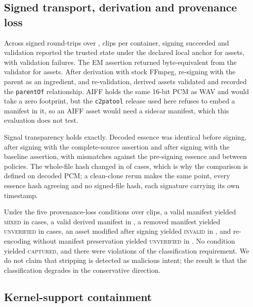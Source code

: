 \documentclass[preprint,3p,11pt,authoryear]{elsarticle}
\begin{document}
\subsection{Signed transport, derivation and provenance loss}
\label{sec:res-transport}

Across \Ftotal{} signed round-trips over \Fcontainerlist{}, \Fclips{} clips
per container, signing succeeded and validation reported the
trusted state under the declared local anchor for \Ftrusted{} assets, with
\Fvalfail{} validation failures. The EM assertion returned byte-equivalent from
the validator for \Fassertion{} assets. After derivation with stock FFmpeg,
re-signing with the parent as an ingredient, and re-validation, \Fderived{}
derived assets validated and \Fparent{} recorded the \texttt{parentOf}
relationship. AIFF holds the same 16-bit PCM as WAV and would take a zero
footprint, but the \texttt{c2patool} release used here refuses to embed a
manifest in it, so an AIFF asset would need a sidecar manifest, which this
evaluation does not test.

Signal transparency holds exactly. Decoded essence was identical before
signing, after signing with the complete-source assertion and after signing
with the baseline assertion, with \Fmismatch{} mismatches against the
pre-signing essence and \FmismatchPolicy{} between policies. The whole-file hash changed in \Ffilechanged{} of \Ftotal{} cases, which is
why the comparison is defined on decoded PCM; a clean-clone rerun makes the
same point, every essence hash agreeing and no signed-file hash, each
signature carrying its own timestamp.

Under the five provenance-loss conditions over \Eclips{} clips, a valid
manifest yielded \textsc{mixed} in \Evalid{} cases, a valid derived manifest
in \EvalidDerived{}, a removed manifest yielded \textsc{unverified} in
\Estripped{} cases, an asset modified after signing yielded \textsc{invalid} in
\Etampered{}, and re-encoding without manifest preservation yielded
\textsc{unverified} in \Ereenc{}. No condition yielded \textsc{captured}, and there were \Eviol{} violations of the
classification requirement. We do not claim that stripping is detected as
malicious intent; the result is that the classification degrades in the
conservative direction.

\subsection{Kernel-support containment}
\label{sec:res-containment}
\end{document}
